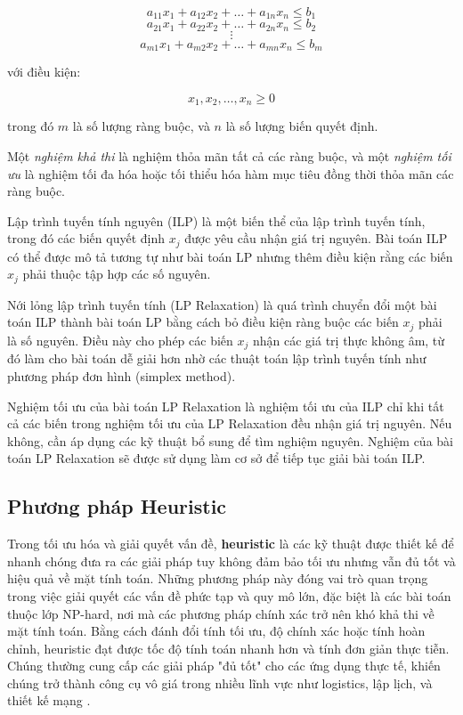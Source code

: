 \[
a_{11} x_1 + a_{12} x_2 + \dots + a_{1n} x_n \leq b_1
\]
\[
a_{21} x_1 + a_{22} x_2 + \dots + a_{2n} x_n \leq b_2
\]
\[
\vdots
\]
\[
a_{m1} x_1 + a_{m2} x_2 + \dots + a_{mn} x_n \leq b_m
\]

với điều kiện:

\[
x_1, x_2, \dots, x_n \geq 0
\]

trong đó \(m\) là số lượng ràng buộc, và \(n\) là số lượng biến quyết định.

Một \textit{nghiệm khả thi} là nghiệm thỏa mãn tất cả các ràng buộc, và một \textit{nghiệm tối ưu} là nghiệm tối đa hóa hoặc tối thiểu hóa hàm mục tiêu đồng thời thỏa mãn các ràng buộc.

Lập trình tuyến tính nguyên (ILP) là một biến thể của lập trình tuyến tính, trong đó các biến quyết định \(x_j\) được yêu cầu nhận giá trị nguyên. Bài toán ILP có thể được mô tả tương tự như bài toán LP nhưng thêm điều kiện rằng các biến \(x_j\) phải thuộc tập hợp các số nguyên.

Nới lỏng lập trình tuyến tính (LP Relaxation) là quá trình chuyển đổi một bài toán ILP thành bài toán LP bằng cách bỏ điều kiện ràng buộc các biến \(x_j\) phải là số nguyên. Điều này cho phép các biến \(x_j\) nhận các giá trị thực không âm, từ đó làm cho bài toán dễ giải hơn nhờ các thuật toán lập trình tuyến tính như phương pháp đơn hình (simplex method).

Nghiệm tối ưu của bài toán LP Relaxation là nghiệm tối ưu của ILP chỉ khi tất cả các biến trong nghiệm tối ưu của LP Relaxation đều nhận giá trị nguyên. Nếu không, cần áp dụng các kỹ thuật bổ sung để tìm nghiệm nguyên. Nghiệm của bài toán LP Relaxation sẽ được sử dụng làm cơ sở để tiếp tục giải bài toán ILP.


\subsection{Phương pháp Heuristic}

\hspace{0.5cm}Trong tối ưu hóa và giải quyết vấn đề, \textbf{heuristic} là các kỹ thuật được thiết kế để nhanh chóng đưa ra các giải pháp tuy không đảm bảo tối ưu nhưng vẫn đủ tốt và hiệu quả về mặt tính toán. Những phương pháp này đóng vai trò quan trọng trong việc giải quyết các vấn đề phức tạp và quy mô lớn, đặc biệt là các bài toán thuộc lớp NP-hard, nơi mà các phương pháp chính xác trở nên khó khả thi về mặt tính toán. Bằng cách đánh đổi tính tối ưu, độ chính xác hoặc tính hoàn chỉnh, heuristic đạt được tốc độ tính toán nhanh hơn và tính đơn giản thực tiễn. Chúng thường cung cấp các giải pháp "đủ tốt" cho các ứng dụng thực tế, khiến chúng trở thành công cụ vô giá trong nhiều lĩnh vực như logistics, lập lịch, và thiết kế mạng \cite{silver2002heuristic}.

